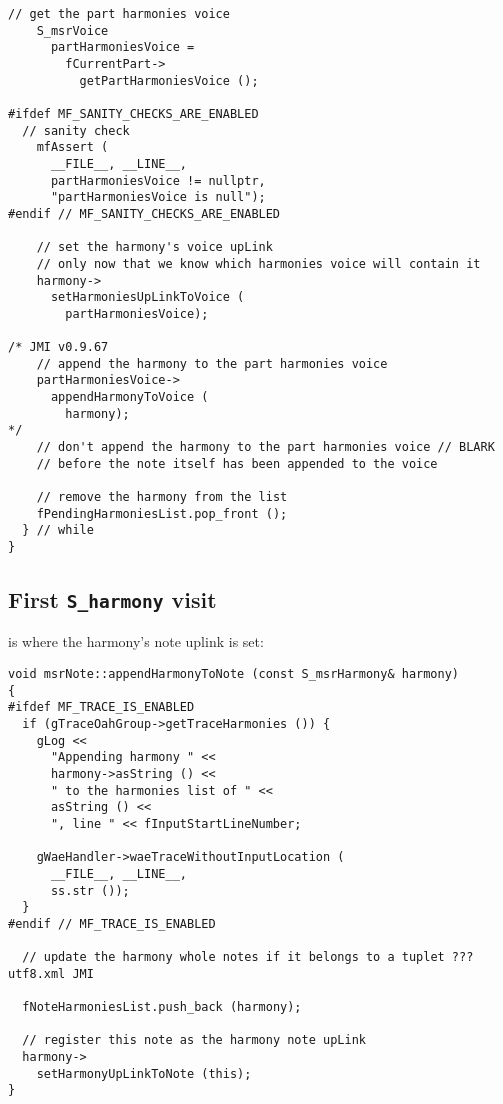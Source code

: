 \begin{lstlisting}[language=CPlusPlus]
    // get the part harmonies voice
    S_msrVoice
      partHarmoniesVoice =
        fCurrentPart->
          getPartHarmoniesVoice ();

#ifdef MF_SANITY_CHECKS_ARE_ENABLED
  // sanity check
    mfAssert (
      __FILE__, __LINE__,
      partHarmoniesVoice != nullptr,
      "partHarmoniesVoice is null");
#endif // MF_SANITY_CHECKS_ARE_ENABLED

    // set the harmony's voice upLink
    // only now that we know which harmonies voice will contain it
    harmony->
      setHarmoniesUpLinkToVoice (
        partHarmoniesVoice);

/* JMI v0.9.67
    // append the harmony to the part harmonies voice
    partHarmoniesVoice->
      appendHarmonyToVoice (
        harmony);
*/
    // don't append the harmony to the part harmonies voice // BLARK
    // before the note itself has been appended to the voice

    // remove the harmony from the list
    fPendingHarmoniesList.pop_front ();
  } // while
}
\end{lstlisting}


\subsection{First {\tt S_harmony} visit}

 is where the harmony's note uplink is set:
\begin{lstlisting}[language=CPlusPlus]
void msrNote::appendHarmonyToNote (const S_msrHarmony& harmony)
{
#ifdef MF_TRACE_IS_ENABLED
  if (gTraceOahGroup->getTraceHarmonies ()) {
    gLog <<
      "Appending harmony " <<
      harmony->asString () <<
      " to the harmonies list of " <<
      asString () <<
      ", line " << fInputStartLineNumber;

    gWaeHandler->waeTraceWithoutInputLocation (
      __FILE__, __LINE__,
      ss.str ());
  }
#endif // MF_TRACE_IS_ENABLED

  // update the harmony whole notes if it belongs to a tuplet ??? utf8.xml JMI

  fNoteHarmoniesList.push_back (harmony);

  // register this note as the harmony note upLink
  harmony->
    setHarmonyUpLinkToNote (this);
}
\end{lstlisting}

